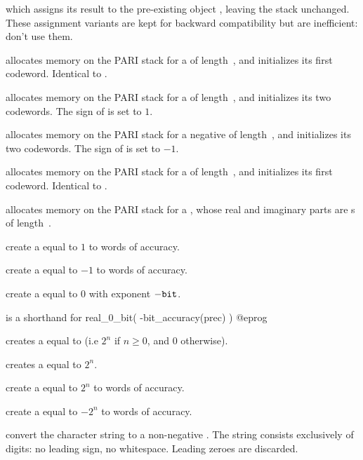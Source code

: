 
\noindent which assigns its result to the pre-existing object
, leaving the stack unchanged. These assignment variants are kept for
backward compatibility but are inefficient: don't use them.


 allocates memory on the PARI stack for a 
of length~, and initializes its first codeword. Identical to
.

 allocates memory on the PARI stack for a
 of length~, and initializes its two codewords. The sign
of  is set to $1$.

 allocates memory on the PARI stack for a negative
 of length~, and initializes its two codewords. The sign
of  is set to $-1$.

 allocates memory on the PARI stack for a 
of length~, and initializes its first codeword. Identical to
.

 allocates memory on the PARI stack for a
, whose real and imaginary parts are s
of length~.

 create a  equal to $1$ to 
words of accuracy.

 create a  equal to $-1$ to 
words of accuracy.

 create a  equal to $0$ with
exponent $-{\tt bit}$.

 is a shorthand for
\bprog
  real_0_bit( -bit_accuracy(prec) )
@eprog

 creates a  equal to  (i.e
$2^n$ if $n \geq 0$, and $0$ otherwise).

 creates a  equal to $2^n$.

 create a  equal to $2^n$
to  words of accuracy.

 create a  equal to $-2^n$
to  words of accuracy.

 convert the character string  to a
non-negative . The string  consists exclusively of digits: no
leading sign, no whitespace. Leading zeroes are discarded.

